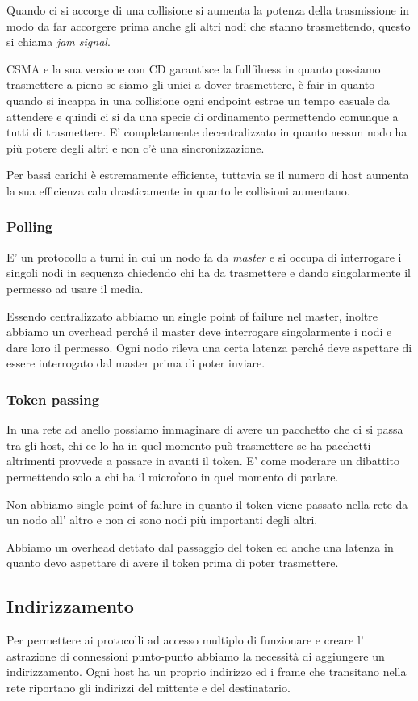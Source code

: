Quando ci si accorge di una collisione si aumenta la potenza della trasmissione in modo da far accorgere prima anche gli altri nodi che stanno trasmettendo, questo si chiama \emph{jam signal}.

CSMA e la sua versione con CD garantisce la fullfilness in quanto possiamo trasmettere a pieno se siamo gli unici a dover trasmettere, è fair in quanto quando si incappa in una collisione ogni endpoint estrae un tempo casuale da attendere e quindi ci si da una specie di ordinamento permettendo comunque a tutti di trasmettere.
E' completamente decentralizzato in quanto nessun nodo ha più potere degli altri e non c'è una sincronizzazione.

Per bassi carichi è estremamente efficiente, tuttavia se il numero di host aumenta la sua efficienza cala drasticamente in quanto le collisioni aumentano.

\subsubsection{Polling}
E' un protocollo a turni in cui un nodo fa da \emph{master} e si occupa di interrogare i singoli nodi in sequenza chiedendo chi ha da trasmettere e dando singolarmente il permesso ad usare il media.

Essendo centralizzato abbiamo un single point of failure nel master, inoltre abbiamo un overhead perché il master deve interrogare singolarmente i nodi e dare loro il permesso.
Ogni nodo rileva una certa latenza perché deve aspettare di essere interrogato dal master prima di poter inviare.

\subsubsection{Token passing}
In una rete ad anello possiamo immaginare di avere un pacchetto che ci si passa tra gli host, chi ce lo ha in quel momento può trasmettere se ha pacchetti altrimenti provvede a passare in avanti il token.
E' come moderare un dibattito permettendo solo a chi ha il microfono in quel momento di parlare.

Non abbiamo single point of failure in quanto il token viene passato nella rete da un nodo all' altro e non ci sono nodi più importanti degli altri.

Abbiamo un overhead dettato dal passaggio del token ed anche una latenza in quanto devo aspettare di avere il token prima di poter trasmettere.

\subsection{Indirizzamento}
Per permettere ai protocolli ad accesso multiplo di funzionare e creare l' astrazione di connessioni punto-punto abbiamo la necessità di aggiungere un indirizzamento.
Ogni host ha un proprio indirizzo ed i frame che transitano nella rete riportano gli indirizzi del mittente e del destinatario.

